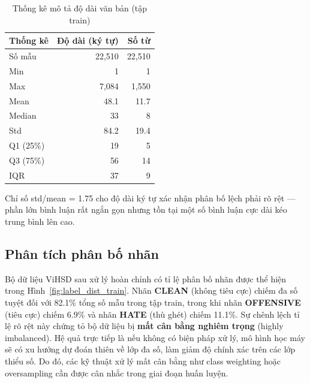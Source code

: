 \begin{table}[H]
    \centering
    \caption{Thống kê mô tả độ dài văn bản (tập train)}
    \label{tab:desc_stats}
    \begin{tabular}{lrr}
        \hline
        \textbf{Thống kê} & \textbf{Độ dài (ký tự)} & \textbf{Số từ} \\
        \hline
        Số mẫu            & 22,510                  & 22,510         \\
        Min               & 1                       & 1              \\
        Max               & 7,084                   & 1,550          \\
        Mean              & 48.1                    & 11.7           \\
        Median            & 33                      & 8              \\
        Std               & 84.2                    & 19.4           \\
        Q1 (25\%)         & 19                      & 5              \\
        Q3 (75\%)         & 56                      & 14             \\
        IQR               & 37                      & 9              \\
        \hline
    \end{tabular}
\end{table}

Chỉ số std/mean = 1.75 cho độ dài ký tự xác nhận phân bố lệch phải rõ rệt — phần lớn bình luận rất ngắn gọn nhưng tồn tại một số bình luận cực dài kéo trung bình lên cao.

\subsection{Phân tích phân bố nhãn}
Bộ dữ liệu ViHSD sau xử lý hoàn chỉnh có tỉ lệ phân bố nhãn được thể hiện trong Hình~\ref{fig:label_dist_train}. Nhãn \textbf{CLEAN} (không tiêu cực) chiếm đa số tuyệt đối với 82.1\% tổng số mẫu trong tập train, trong khi nhãn \textbf{OFFENSIVE} (tiêu cực) chiếm 6.9\% và nhãn \textbf{HATE} (thù ghét) chiếm 11.1\%. Sự chênh lệch tỉ lệ rõ rệt này chứng tỏ bộ dữ liệu bị \textbf{mất cân bằng nghiêm trọng} (highly imbalanced). Hệ quả trực tiếp là nếu không có biện pháp xử lý, mô hình học máy sẽ có xu hướng dự đoán thiên về lớp đa số, làm giảm độ chính xác trên các lớp thiểu số. Do đó, các kỹ thuật xử lý mất cân bằng như class weighting hoặc oversampling cần được cân nhắc trong giai đoạn huấn luyện.

